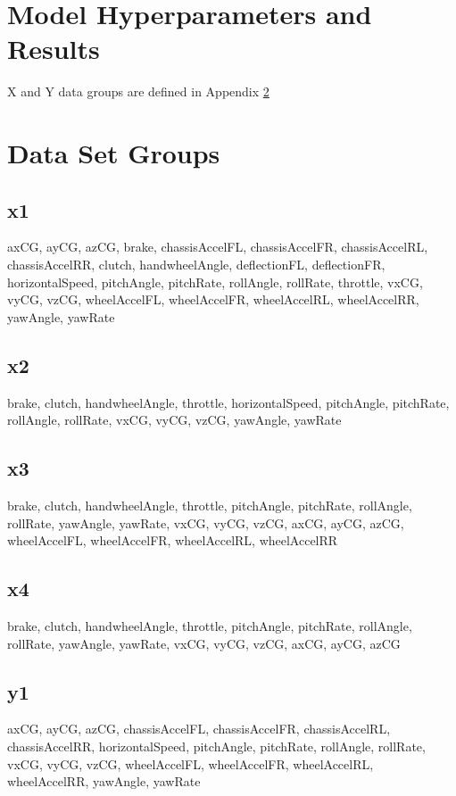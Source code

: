 \documentclass{article}
\begin{document}
\begin{appendices}
\section{Model Hyperparameters and Results}
X and Y data groups are defined in Appendix \ref{appendix:data}

\label{appendix:models}

\section{Data Set Groups}
\label{appendix:data}
\subsection{x1}
\label{appendix:datax1}
axCG, ayCG, azCG, brake, chassisAccelFL, chassisAccelFR, chassisAccelRL, chassisAccelRR, clutch, handwheelAngle, deflectionFL, deflectionFR, horizontalSpeed, pitchAngle, pitchRate, rollAngle, rollRate, throttle, vxCG, vyCG, vzCG, wheelAccelFL, wheelAccelFR, wheelAccelRL, wheelAccelRR, yawAngle, yawRate
\subsection{x2}
\label{appendix:datax2}
brake, clutch, handwheelAngle, throttle, horizontalSpeed, pitchAngle, pitchRate, rollAngle, rollRate, vxCG, vyCG, vzCG, yawAngle, yawRate
\subsection{x3}
\label{appendix:datax3}
brake, clutch, handwheelAngle, throttle, pitchAngle, pitchRate, rollAngle, rollRate, yawAngle, yawRate, vxCG, vyCG, vzCG, axCG, ayCG, azCG, wheelAccelFL, wheelAccelFR, wheelAccelRL, wheelAccelRR
\subsection{x4}
\label{appendix:datax4}
brake, clutch, handwheelAngle, throttle, pitchAngle, pitchRate, rollAngle, rollRate, yawAngle, yawRate, vxCG, vyCG, vzCG, axCG, ayCG, azCG
\subsection{y1}
\label{appendix:datay1}
axCG, ayCG, azCG, chassisAccelFL, chassisAccelFR, chassisAccelRL, chassisAccelRR, horizontalSpeed, pitchAngle, pitchRate, rollAngle, rollRate, vxCG, vyCG, vzCG, wheelAccelFL, wheelAccelFR, wheelAccelRL, wheelAccelRR, yawAngle, yawRate

\end{appendices}
\end{document}
